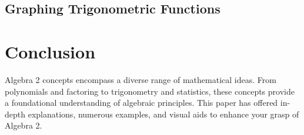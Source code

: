 \documentclass{article}
\begin{document}
\subsection{Graphing Trigonometric Functions}

\section{Conclusion}
Algebra 2 concepts encompass a diverse range of mathematical ideas. From polynomials and factoring to trigonometry and statistics, these concepts provide a foundational understanding of algebraic principles. This paper has offered in-depth explanations, numerous examples, and visual aids to enhance your grasp of Algebra 2.
\end{document}
